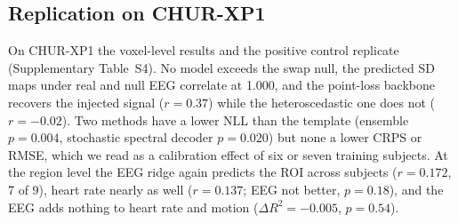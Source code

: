 \subsection{Replication on CHUR-XP1}\label{sec:res:xp1}
On CHUR-XP1 the voxel-level results and the positive control replicate (Supplementary Table~S4). No model exceeds the swap null, the predicted SD maps under real and null EEG correlate at 1.000, and the point-loss backbone recovers the injected signal ($r=0.37$) while the heteroscedastic one does not ($r=-0.02$). Two methods have a lower NLL than the template (ensemble $p=0.004$, stochastic spectral decoder $p=0.020$) but none a lower CRPS or RMSE, which we read as a calibration effect of six or seven training subjects. At the region level the EEG ridge again predicts the ROI across subjects ($r=0.172$, 7 of 9), heart rate nearly as well ($r=0.137$; EEG not better, $p=0.18$), and the EEG adds nothing to heart rate and motion ($\Delta R^2=-0.005$, $p=0.54$).
